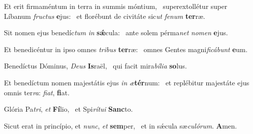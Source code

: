 \item Et erit firmaméntum in terra in summis móntium,~\pscross{} superextollétur super Líbanum \textit{fructus} \textbf{e}jus:~\psstar{} et florébunt de civitáte sic\textit{ut} \textit{fenum} \textbf{ter}ræ.
\item Sit nomen ejus benedíc\textit{tum} \textit{in} \textbf{sǽ}cula:~\psstar{} ante solem pérma\textit{net} \textit{nomen} \textbf{e}jus.
\item Et benedicéntur in ipso omnes \textit{tribus} \textbf{ter}ræ:~\psstar{} omnes Gentes magni\textit{ficábunt} \textbf{e}um.
\item Benedíctus Dóminus, \textit{Deus} \textbf{Is}raël,~\psstar{} qui facit mira\textit{bília} \textbf{so}lus.
\item Et benedíctum nomen majestátis ejus \textit{in} \textit{æ}\textbf{tér}num:~\psstar{} et replébitur majestáte ejus omnis ter\textit{ra}: \textit{fiat}, \textbf{fi}at.
\item Glória Pa\textit{tri}, \textit{et} \textbf{Fí}lio,~\psstar{} et Spi\textit{rítui} \textbf{Sanc}to.
\item Sicut erat in princípio, et \textit{nunc}, \textit{et} \textbf{sem}per,~\psstar{} et in sǽcula sæ\textit{culórum}. \textbf{A}men.
